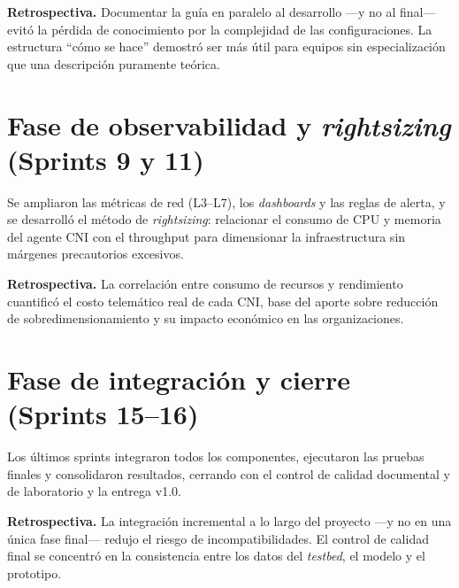 \textbf{Retrospectiva.} Documentar la guía en paralelo al desarrollo ---y no al final--- evitó la pérdida de conocimiento por la complejidad de las configuraciones. La estructura ``cómo se hace'' demostró ser más útil para equipos sin especialización que una descripción puramente teórica.

\section{Fase de observabilidad y \emph{rightsizing} (Sprints 9 y 11)}

Se ampliaron las métricas de red (L3--L7), los \emph{dashboards} y las reglas de alerta, y se desarrolló el método de \emph{rightsizing}: relacionar el consumo de CPU y memoria del agente CNI con el throughput para dimensionar la infraestructura sin márgenes precautorios excesivos.

\textbf{Retrospectiva.} La correlación entre consumo de recursos y rendimiento cuantificó el costo telemático real de cada CNI, base del aporte sobre reducción de sobredimensionamiento y su impacto económico en las organizaciones.

\section{Fase de integración y cierre (Sprints 15--16)}

Los últimos sprints integraron todos los componentes, ejecutaron las pruebas finales y consolidaron resultados, cerrando con el control de calidad documental y de laboratorio y la entrega v1.0.

\textbf{Retrospectiva.} La integración incremental a lo largo del proyecto ---y no en una única fase final--- redujo el riesgo de incompatibilidades. El control de calidad final se concentró en la consistencia entre los datos del \emph{testbed}, el modelo y el prototipo.
